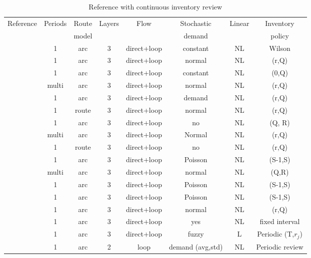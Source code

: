 \documentclass[a4paper,10pt]{article}
\begin{document}
\begin{linenumbers}
\begin{table}[htbp]
	\scriptsize
\begin{tabular}{lccccccc}
	\toprule
	Reference & Periods & Route & Layers   & Flow &  Stochastic & Linear & Inventory \\
             &          & model & 		   & 	   &     demand        &        & policy                 \\
 \midrule
\cite{Yuchi2016}	&	1	&	arc	&	3 &	direct+loop	&	constant	&	NL	&	Wilson	\\	
\cite{AhmadiJavid2010}	&	1	&	arc  &	3 &	direct+loop	&	normal	&	NL	&	(r,Q) 	\\	
\cite{AhmSed2012}	&	1	&	arc &	3 	&	direct+loop	&	constant 	&	NL	&	(0,Q)	\\	
\cite{Nekooghadirli2014}	&	multi	&	arc &	3 	&	direct+loop	&	normal 	&	NL	&	(r,Q) 	\\	
\cite{Seyedhosseini2014} &	1	&	arc	&3 &	direct+loop	&	demand	&	NL	&	(r,Q) 	\\	
\cite{LiuChenLiLiu2015}	&	1	&	route	&	3 	&	direct+loop	&	normal	&	NL	&	(r,Q) 	\\	
\cite{Tang2016}	&	1	&	arc	&	3 	&	direct+loop	&	no	&	NL	&	(Q, R)	\\	
\cite{Zhalechian2016}	&	multi	&	arc	&	3 	&	direct+loop	&	Normal	&	NL	&	(r,Q) 	\\	
\cite{Deng2016} & 1	&	route	&	3 	&	direct+loop	&	no	&	NL	&	(r,Q) 	\\	
\cite{Dehghani2017}	&	1	&	arc	&	3 	&	direct+loop	&	Poisson	&	NL	&	(S-1,S)	\\	
\cite{Rafie-Majd2018}	&multi	&	arc	&	3 	&	direct+loop	&	normal	&	NL	&	(Q,R)	\\	
\cite{HabibiAS2018}		&	1	&	arc	&	3 &	direct+loop	&	 Poisson 	&	NL	&	(S-1,S)	\\	
\cite{Asadi2018}		&	1	&	arc	&	3 	&	direct+loop	&	Poisson 	&	NL	&	(S-1,S)	\\	
\cite{Saragih2018}	&	1	&	arc	&	3 	&	direct+loop	&	 normal	&	NL	&	(r,Q) 	\\	
\cite{Sajjadi2011}	&	1	&	arc  	&	3	&	direct+loop	&	yes	&	NL	&	fixed interval \\	
\cite{ChenChenSunLiu2014}	&	1	&	arc	&	3 	&	direct+loop	&	fuzzy 	&	L	&	Periodic (T,$r_j$)	\\	
\cite{Zheng2019}		&   1		& arc		& 2		& loop					&  demand (avg,std) & NL & Periodic review \\
\bottomrule
\end{tabular}
\caption{Reference with continuous inventory review}
	\label{tab1}
\end{table}


\end{linenumbers}
\end{document}
